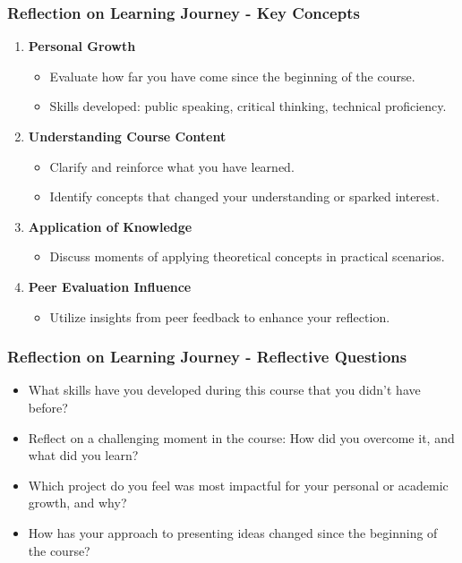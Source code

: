 \documentclass{beamer}
\begin{document}
\begin{frame}[fragile]
    \frametitle{Reflection on Learning Journey - Key Concepts}
    \begin{enumerate}
        \item \textbf{Personal Growth}
            \begin{itemize}
                \item Evaluate how far you have come since the beginning of the course.
                \item Skills developed: public speaking, critical thinking, technical proficiency.
            \end{itemize}
            
        \item \textbf{Understanding Course Content}
            \begin{itemize}
                \item Clarify and reinforce what you have learned.
                \item Identify concepts that changed your understanding or sparked interest.
            \end{itemize}
            
        \item \textbf{Application of Knowledge}
            \begin{itemize}
                \item Discuss moments of applying theoretical concepts in practical scenarios.
            \end{itemize}
        
        \item \textbf{Peer Evaluation Influence}
            \begin{itemize}
                \item Utilize insights from peer feedback to enhance your reflection.
            \end{itemize}
    \end{enumerate}
\end{frame}

\begin{frame}[fragile]
    \frametitle{Reflection on Learning Journey - Reflective Questions}
    \begin{itemize}
        \item What skills have you developed during this course that you didn’t have before?
        \item Reflect on a challenging moment in the course: How did you overcome it, and what did you learn?
        \item Which project do you feel was most impactful for your personal or academic growth, and why?
        \item How has your approach to presenting ideas changed since the beginning of the course?
    \end{itemize}
\end{frame}
\end{document}
